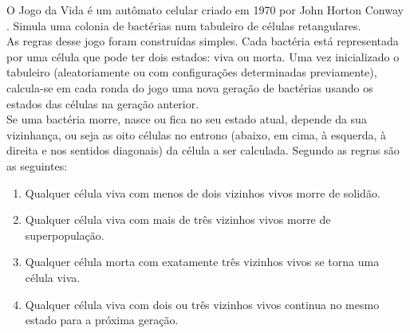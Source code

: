 O Jogo da Vida é um autômato celular criado em 1970 por John Horton Conway \cite{wikipedia}. Simula uma colonia de bactérias num tabuleiro de células retangulares.\\

As regras desse jogo foram construídas simples. Cada bactéria está representada por uma célula que pode ter dois estados: viva ou morta. Uma vez inicializado o tabuleiro (aleatoriamente ou com configurações determinadas previamente), calcula-se em cada ronda do jogo uma nova geração de bactérias usando os estados das células na geração anterior.\\

Se uma bactéria morre, nasce ou fica no seu estado atual, depende da sua vizinhança, ou seja as oito células no entrono  (abaixo, em cima, à esquerda,  à direita e nos sentidos diagonais) da célula a ser calculada. Segundo \cite{wikipedia} as regras são as seguintes:
\begin{enumerate}

 \item Qualquer célula viva com menos de dois vizinhos vivos morre de solidão.
 \item   Qualquer célula viva com mais de três vizinhos vivos morre de superpopulação.
 \item   Qualquer célula morta com exatamente três vizinhos vivos se torna uma célula viva.
 \item   Qualquer célula viva com dois ou três vizinhos vivos continua no mesmo estado para a próxima geração.

\end{enumerate}

